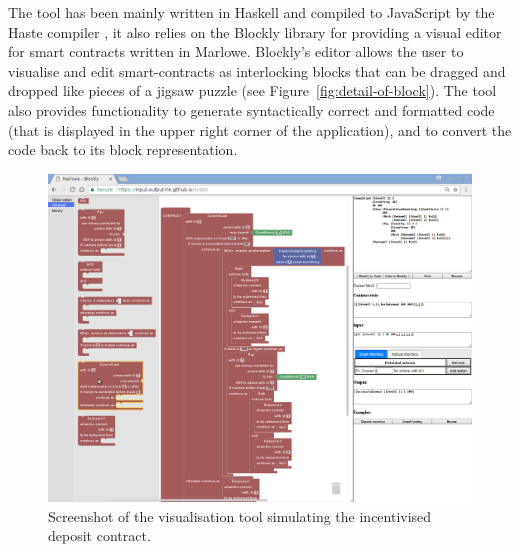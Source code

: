 \documentclass[
      acmsmall
    , screen
    , review=true
  ]{acmart}
\begin{document}
The tool has been mainly written in Haskell and compiled to JavaScript
by the Haste compiler \cite{Haste}, it also relies on
the Blockly library \cite{Blockly} for providing a visual
editor for smart contracts written in Marlowe. Blockly's editor allows
the user to visualise and edit smart-contracts as interlocking blocks
that can be dragged and dropped like pieces of a jigsaw puzzle (see
Figure~\ref{fig:detail-of-block}). The tool also provides functionality
to generate syntactically correct and formatted code (that is displayed
in the upper right corner of the application), and to convert the
code back to its block representation.

\begin{figure}
\begin{centering}
\includegraphics[width=1\textwidth]{pix/screenshot1}
\par\end{centering}
\caption{\label{fig:full-screenshot-demo}Screenshot of the visualisation tool
simulating the incentivised deposit contract.}
\end{figure}
\end{document}
